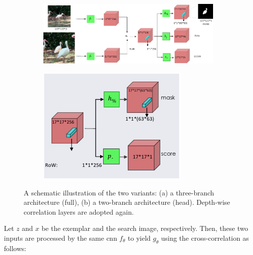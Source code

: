 \begin{figure}[t]
    \centering
    \begin{subfigure}[b]{0.68\textwidth}
        \centering
        \includegraphics[width=\textwidth]{figures/theoretical_foundations/siam_mask_architecture_3_branch.pdf}
        \caption[]{}
    \end{subfigure}
    \hfill
    \begin{subfigure}[b]{0.31\textwidth}
        \centering
        \includegraphics[width=\textwidth]{figures/theoretical_foundations/siam_mask_architecture_2_branch_head.pdf}
        \caption[]{}
    \end{subfigure}
    \caption[ architecture]{A schematic illustration of the two  variants: (a) a three-branch architecture (full), (b) a two-branch architecture (head). Depth-wise correlation layers are adopted again. }
    \label{fig:SiamMaskArchitecture}
\end{figure}

Let $z$ and $x$ be the exemplar and the search image, respectively. Then, these two inputs are processed by the same \gls{cnn} $f_\theta$ to yield $g_\theta$ using the cross-correlation as follows:

